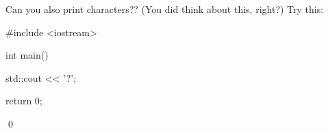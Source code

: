 Can you also print characters?? (You did think about this, right?) Try this:
\begin{console}
#include <iostream>

int main()
{
    std::cout << '?';

    return 0;
}
\end{console}
\qed
